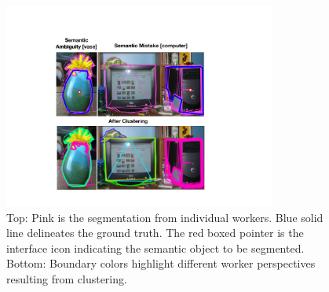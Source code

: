 \begin{figure}[h!]
    \centering
    \includegraphics[width=0.8\textwidth]{plots/semantic_error_clust.pdf}
    \caption{Top: Pink is the segmentation from individual workers. Blue solid line delineates the ground truth. The red boxed pointer is the interface icon indicating the semantic object to be segmented. Bottom: Boundary colors highlight different worker perspectives resulting from clustering.}
    \label{error_examples}
    \setlength{\abovecaptionskip}{-10pt}
    \setlength{\belowcaptionskip}{-10pt}
\end{figure}